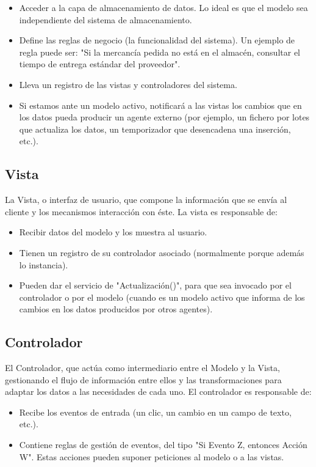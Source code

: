 \documentclass[a4paper,12pt]{article}
\begin{document}
\begin{itemize}
  \item Acceder a la capa de almacenamiento de datos. Lo ideal es que el modelo 
sea independiente del sistema de almacenamiento.
  \item Define las reglas de negocio (la funcionalidad del sistema). Un ejemplo 
de regla puede ser: "Si la mercancía pedida no está en el almacén, consultar el 
tiempo de entrega estándar del proveedor".
  \item Lleva un registro de las vistas y controladores del sistema.
  \item Si estamos ante un modelo activo, notificará a las vistas los cambios 
que en los datos pueda producir un agente externo (por ejemplo, un fichero por 
lotes  que actualiza los datos, un temporizador que desencadena una inserción, 
etc.).
\end{itemize}

\subsection{Vista}
La Vista, o interfaz de usuario, que compone la información que se envía al 
cliente y los mecanismos interacción con éste.
La vista es responsable de:

\begin{itemize}
  \item Recibir datos del modelo y los muestra al usuario.
  \item Tienen un registro de su controlador asociado (normalmente porque 
además lo instancia).
  \item Pueden dar el servicio de "Actualización()", para que sea invocado por 
el controlador o por el modelo (cuando es un modelo activo que informa de los 
cambios en los datos producidos por otros agentes).
\end{itemize}

\subsection{Controlador}
El Controlador, que actúa como intermediario entre el Modelo y la Vista, 
gestionando el flujo de información entre ellos y las transformaciones para 
adaptar los datos a las necesidades de cada uno.
El controlador es responsable de:
\begin{itemize}
  \item Recibe los eventos de entrada (un clic, un cambio en un campo de texto, 
etc.).
  \item Contiene reglas de gestión de eventos, del tipo "Si Evento Z, entonces 
Acción W". Estas acciones pueden suponer peticiones al modelo o a las vistas.
\end{itemize}
\end{document}
